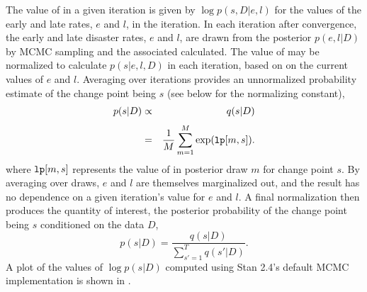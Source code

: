 The value of  in a given iteration is given by $\log
p(s,D|e,l)$ for the values of the early and late rates, $e$ and $l$,
in the iteration.  In each iteration after convergence, the early and
late disaster rates, $e$ and $l$, are drawn from the posterior
$p(e,l|D)$ by MCMC sampling and the associated  calculated.
The value of  may be normalized to calculate $p(s|e,l,D)$ in
each iteration, based on on the current values of $e$ and $l$.
Averaging over iterations provides an unnormalized probability
estimate of the change point being $s$ (see below for the normalizing
constant),
%
\begin{eqnarray*}
p(s | D)
& \propto &
q(s | D)
\\[3pt]
& = &
\frac{1}{M} \sum_{m=1}^{M} \exp({\tt lp}[m,s]).
\end{eqnarray*}
%
where $\mbox{{\tt lp}}[m,s]$ represents the value of  in
posterior draw $m$ for change point $s$.  By averaging over draws,
$e$ and $l$ are themselves marginalized out, and the result has no
dependence on a given iteration's value for $e$ and $l$.  A final
normalization then produces the quantity of interest, the posterior
probability of the change point being $s$ conditioned on the data $D$,
%
\[
p(s | D)
=
\frac{q(s|D)}{\sum_{s'=1}^T q(s' | D)}.
\]
%
A plot of the values of $\log p(s|D)$ computed using Stan 2.4's
default MCMC implementation is shown in
.
%
